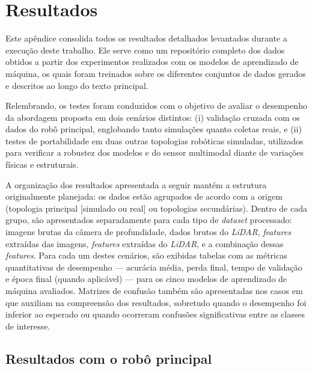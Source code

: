 
\chapter{Resultados}

Este apêndice consolida todos os resultados detalhados levantados durante a execução deste trabalho. Ele serve como um repositório completo dos dados obtidos a partir dos experimentos realizados com os modelos de aprendizado de máquina, os quais foram treinados sobre os diferentes conjuntos de dados gerados e descritos ao longo do texto principal.

Relembrando, os testes foram conduzidos com o objetivo de avaliar o desempenho da abordagem proposta em dois cenários distintos: (i) validação cruzada com os dados do robô principal, englobando tanto simulações quanto coletas reais, e (ii) testes de portabilidade em duas outras topologias robóticas simuladas, utilizados para verificar a robustez dos modelos e do sensor multimodal diante de variações físicas e estruturais.

A organização dos resultados apresentada a seguir mantém a estrutura originalmente planejada: os dados estão agrupados de acordo com a origem (topologia principal [simulado ou real] ou topologias secundárias). Dentro de cada grupo, são apresentados separadamente para cada tipo de \textit{dataset} processado: imagens brutas da câmera de profundidade, dados brutos do \textit{LiDAR}, \textit{features} extraídas das imagens, \textit{features} extraídas do \textit{LiDAR}, e a combinação dessas \textit{features}. Para cada um destes cenários, são exibidas tabelas com as métricas quantitativas de desempenho — acurácia média, perda final, tempo de validação e época final (quando aplicável) — para os cinco modelos de aprendizado de máquina avaliados. Matrizes de confusão também são apresentadas nos casos em que auxiliam na compreensão dos resultados, sobretudo quando o desempenho foi inferior ao esperado ou quando ocorreram confusões significativas entre as classes de interesse.

\section{Resultados com o robô principal}

